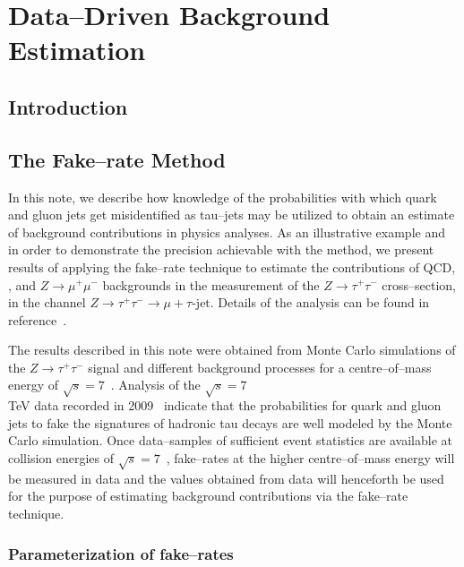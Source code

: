 \ifx\master\undefined\fi

\newcommand{\tablesize}{\small}

\chapter{Data--Driven Background Estimation}
\label{ch:backgrounds}

\section{Introduction}

\section{The Fake--rate Method}

In this note, we describe how knowledge of the probabilities with which quark
and gluon jets get misidentified as tau--jets may be utilized to obtain an
estimate of background contributions in physics analyses.  As an illustrative
example and in order to demonstrate the precision achievable with the method, we
present results of applying the fake--rate technique to estimate the
contributions of QCD, \WpJets, \ttbarpJets and $Z \rightarrow \mu^{+}
\mu^{-}$ backgrounds in the measurement of the $Z \rightarrow \tau^{+} \tau^{-}$
cross--section, in the channel $Z \rightarrow \tau^{+} \tau^{-} \rightarrow \mu
+ \tau\mbox{-jet}$.  Details of the analysis can be found in
reference~\cite{EWKtauNote}.

The results described in this note were obtained from Monte Carlo simulations of
the $Z \rightarrow \tau^{+} \tau^{-}$ signal and different background processes
for a centre--of--mass energy of $\sqrt{s} = 7$~\TeV.  Analysis of the $\sqrt{s}
= 7$~\\TeV data recorded in 2009~\cite{refFakeRate2009dataResults} indicate that
the probabilities for quark and gluon jets to fake the signatures of hadronic
tau decays are well modeled by the Monte Carlo simulation.  Once data--samples
of sufficient event statistics are available at collision energies of $\sqrt{s}
= 7$~\TeV, fake--rates at the higher centre--of--mass energy will be measured in
data and the values obtained from data will henceforth be used for the purpose
of estimating background contributions via the fake--rate technique.

\subsection{Parameterization of fake--rates}

